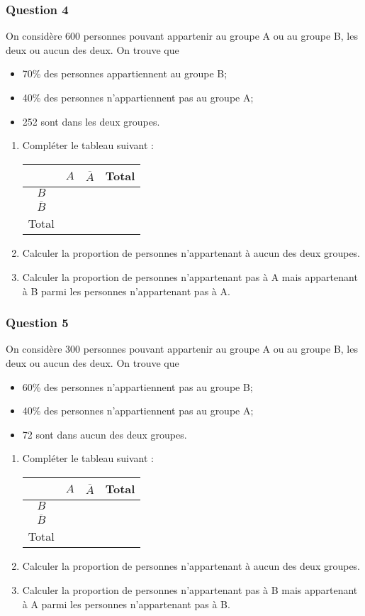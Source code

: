 \documentclass[15pt, mathserif]{beamer}
\begin{document}
\begin{frame} 
	\frametitle{Question 4}
On considère 600 personnes pouvant appartenir au groupe A ou au groupe B, les deux ou aucun des deux. On trouve que 
 \begin{itemize} 
 \item 70\%  des personnes appartiennent au groupe B; 
 \item 40\% des personnes n'appartiennent pas au groupe A; 
 \item 252 sont dans les deux groupes.
 \end{itemize} 
 \begin{enumerate} 
 \item Compléter le tableau suivant : 
 \hfil \begin{tabular}{|c|c|c|c|} 
 \cline{2-4}   
 \multicolumn{1}{c|}{} & $A$ & $\overline{A}$ & Total\\ \hline 
 $B$  &    & &   \\\hline 
 $\overline{B}$   &  &    &    \\\hline	
 Total   & &  &  \\\hline  
 \end{tabular} 
 \item Calculer la proportion de personnes n'appartenant à aucun des deux groupes. 
 \item Calculer la proportion de personnes n'appartenant pas à A mais appartenant à B parmi les personnes n'appartenant pas à A. 
  \end{enumerate} 
 \end{frame}


\begin{frame} 
	\frametitle{Question 5}
On considère 300 personnes pouvant appartenir au groupe A ou au groupe B, les deux ou aucun des deux. On trouve que 
 \begin{itemize} 
 \item 60\%  des personnes n'appartiennent pas au groupe B; 
 \item 40\% des personnes n'appartiennent pas au groupe A; 
 \item 72 sont dans aucun des deux groupes.
 \end{itemize} 
 \begin{enumerate} 
 \item Compléter le tableau suivant : 
 \hfil \begin{tabular}{|c|c|c|c|} 
 \cline{2-4}   
 \multicolumn{1}{c|}{} & $A$ & $\overline{A}$ & Total\\ \hline 
 $B$  &    & &   \\\hline 
 $\overline{B}$   &  &    &    \\\hline	
 Total   & &  &  \\\hline  
 \end{tabular} 
 \item Calculer la proportion de personnes n'appartenant  à aucun des deux groupes. 
 \item Calculer la proportion de personnes n'appartenant pas à B mais appartenant à A parmi les personnes n'appartenant pas à B. 
  \end{enumerate} 
 \end{frame}
\end{document}

